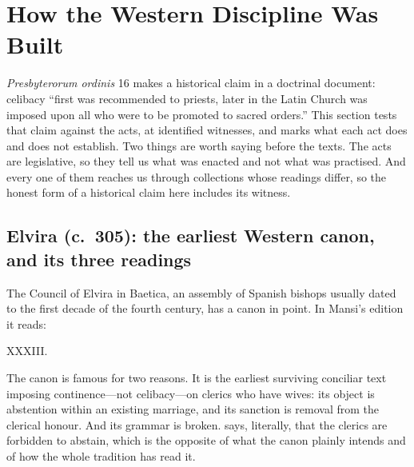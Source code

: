 \section{How the Western Discipline Was Built}

\emph{Presbyterorum ordinis} 16 makes a historical claim in a doctrinal document: celibacy ``first was recommended to priests, later in the Latin Church was imposed upon all who were to be promoted to sacred orders.'' This section tests that claim against the acts, at identified witnesses, and marks what each act does and does not establish. Two things are worth saying before the texts. The acts are legislative, so they tell us what was enacted and not what was practised. And every one of them reaches us through collections whose readings differ, so the honest form of a historical claim here includes its witness.

\subsection{Elvira (c.~305): the earliest Western canon, and its three readings}

The Council of Elvira in Baetica, an assembly of Spanish bishops usually dated to the first decade of the fourth century, has a canon in point. In Mansi's edition it reads:

\begin{studyframe}
XXXIII. 
\end{studyframe}

The canon is famous for two reasons. It is the earliest surviving conciliar text imposing continence---not celibacy---on clerics who have wives: its object is abstention within an existing marriage, and its sanction is removal from the clerical honour. And its grammar is broken.  says, literally, that the clerics are forbidden to abstain, which is the opposite of what the canon plainly intends and of how the whole tradition has read it.

